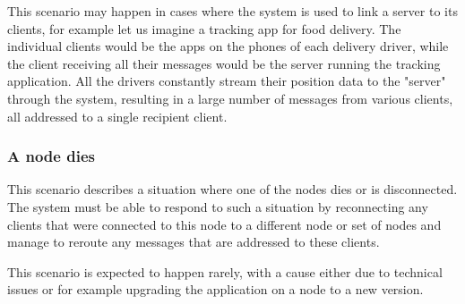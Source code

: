 This scenario may happen in cases where the system is used to link a server to its clients, for example let us imagine a tracking app for food delivery. The individual clients would be the apps on the phones of each delivery driver, while the client receiving all their messages would be the server running the tracking application. All the drivers constantly stream their position data to the "server" through the system, resulting in a large number of messages from various clients, all addressed to a single recipient client.

\subsubsection{A node dies}
This scenario describes a situation where one of the nodes dies or is disconnected. The system must be able to respond to such a situation by reconnecting any clients that were connected to this node to a different node or set of nodes and manage to reroute any messages that are addressed to these clients.

This scenario is expected to happen rarely, with a cause either due to technical issues or for example upgrading the application on a node to a new version.